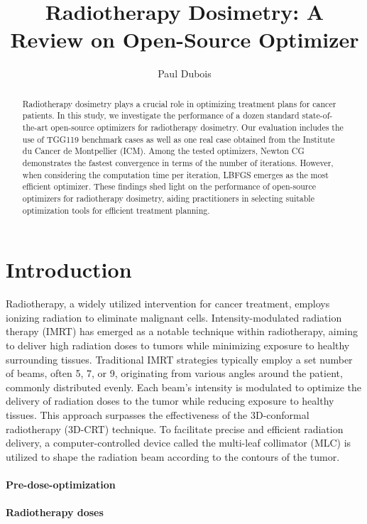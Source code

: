 \documentclass[a4paper]{article}
\title{Radiotherapy Dosimetry: A Review on Open-Source Optimizer}
\author{Paul Dubois}
\begin{document}
	
	\maketitle
	
	\begin{abstract}
		Radiotherapy dosimetry plays a crucial role in optimizing treatment plans for cancer patients.
		In this study, we investigate the performance of a dozen standard state-of-the-art open-source optimizers for radiotherapy dosimetry.
		Our evaluation includes the use of TGG119 benchmark cases as well as one real case obtained from the Institute du Cancer de Montpellier (ICM).
		Among the tested optimizers, Newton CG demonstrates the fastest convergence in terms of the number of iterations.
		However, when considering the computation time per iteration, LBFGS emerges as the most efficient optimizer.
		These findings shed light on the performance of open-source optimizers for radiotherapy dosimetry, aiding practitioners in selecting suitable optimization tools for efficient treatment planning.
	\end{abstract}
	
	\section{Introduction}
	Radiotherapy, a widely utilized intervention for cancer treatment, employs ionizing radiation to eliminate malignant cells.
	Intensity-modulated radiation therapy (IMRT) has emerged as a notable technique within radiotherapy, aiming to deliver high radiation doses to tumors while minimizing exposure to healthy surrounding tissues.
	Traditional IMRT strategies typically employ a set number of beams, often 5, 7, or 9, originating from various angles around the patient, commonly distributed evenly.
	Each beam's intensity is modulated to optimize the delivery of radiation doses to the tumor while reducing exposure to healthy tissues.
	This approach surpasses the effectiveness of the 3D-conformal radiotherapy (3D-CRT) technique.
	To facilitate precise and efficient radiation delivery, a computer-controlled device called the multi-leaf collimator (MLC) is utilized to shape the radiation beam according to the contours of the tumor.
	
	\paragraph{Pre-dose-optimization}
	\paragraph{Radiotherapy doses}
\end{document}
